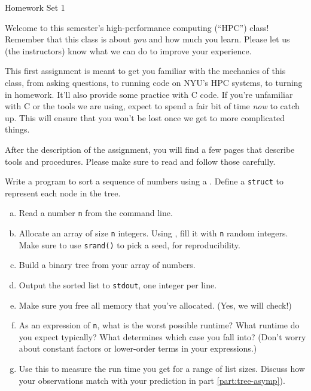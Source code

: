 \documentclass[11pt]{article}
\begin{document}
%
{Homework Set 1}

\smallskip
Welcome to this semester's high-performance computing (``HPC'') class!
Remember that this class is about \emph{you} and how much you learn.
Please let us (the instructors) know what we can do to improve your
experience.

\smallskip This first assignment is meant to get you familiar with the
mechanics of this class, from asking questions, to running code on
NYU's HPC systems, to turning in homework. It'll also provide some
practice with C code. If you're unfamiliar with C or the tools we are
using, expect to spend a fair bit of time \emph{now} to catch up. This
will ensure that you won't be lost once we get to more complicated
things.

\smallskip
After the description of the assignment, you will find a few pages
that describe tools and procedures. Please make sure to read and
follow those carefully.

\bigskip
{}

Write a program to sort a sequence of numbers using a
.
Define a \texttt{struct} to represent each node in
the tree.

\begin{enumerate}[a)]
\item Read a number \texttt{n} from the command line.
\item Allocate an array of size \texttt{n} integers. Using
  ,
  fill it with \texttt{n} random integers. Make sure to use
  \texttt{srand()} to pick a seed, for reproducibility.
\item Build a binary tree from your array of numbers.
\item Output the sorted list to \texttt{stdout}, one integer
  per line.
\item Make sure you free all memory that you've allocated.
  (Yes, we will check!)
\item \label{part:tree-asymp}As an expression of \texttt{n}, what is the worst
possible runtime? What runtime do you expect typically?
What determines which case you fall into?
(Don't worry about constant factors or lower-order
terms in your expressions.)
\item \label{part:tree-runtime-discuss}Use this
to measure the run time you get for a range of list sizes.
Discuss how your observations match with your prediction
in part \ref{part:tree-asymp}).
\end{enumerate}
\end{document}

